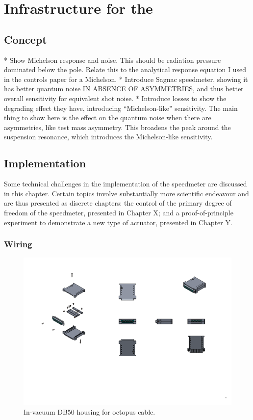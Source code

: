 \chapter{Infrastructure for the \SSMEXPT{}}
\label{c:speedmeter-intro}

\section{Concept}
* Show Michelson response and noise. This should be radiation pressure dominated below the pole. Relate this to the analytical response equation I used in the controls paper for a Michelson.
* Introduce Sagnac speedmeter, showing it has better quantum noise IN ABSENCE OF ASYMMETRIES, and thus better overall sensitivity for equivalent shot noise.
* Introduce losses to show the degrading effect they have, introducing ``Michelson-like'' sensitivity. The main thing to show here is the effect on the quantum noise when there are asymmetries, like test mass asymmetry. This broadens the peak around the suspension resonance, which introduces the Michelson-like sensitivity.

\section{Implementation}

Some technical challenges in the implementation of the speedmeter are discussed in this chapter. Certain topics involve substantially more scientific endeavour and are thus presented as discrete chapters: the control of the primary degree of freedom of the speedmeter, presented in Chapter X; and a proof-of-principle experiment to demonstrate a new type of actuator, presented in Chapter Y.

\subsection{Wiring}


\begin{figure}
  \centering
  \includegraphics[width=0.75\columnwidth]{graphics/50-db50-housing.png}
  \caption{In-vacuum DB50 housing for octopus cable.}
  \label{fig:db50-housing}
\end{figure}